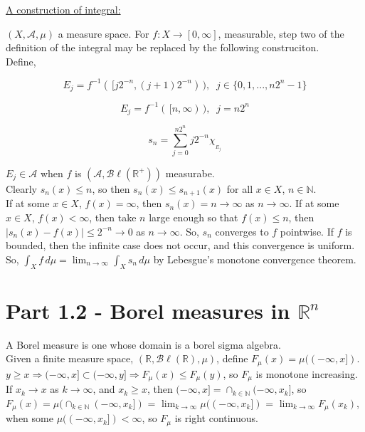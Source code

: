 \documentclass[12pt]{article}
\newcommand{\nats}[0] { \mathbb{N}}
\newcommand{\reals}[0] { \mathbb{R}}
\newcommand{\A}[0] { \mathcal{A} }
\newcommand{\Bl}[0] { \mathcal{B} \ell }
\newcommand{\rimply}[0] { \Rightarrow }
\newcommand{\rarw}[0] { \rightarrow }
\begin{document}
\begin{flushleft}
\underline{A construction of integral:}
\end{flushleft}

$(X ,\A, \mu)$ a measure space. For $f: X \rarw [0, \infty]$, measurable, step two of the definition of the integral may be replaced by the following construciton. \\

Define,

$$
E_j = f^{-1} ( \, [ j 2^{-n}, (j+1) 2^{-n} ) \, ), \; \; j \in \{ 0,1,...,n2^n-1 \}
$$

$$
E_j = f^{-1} ( \, [ n, \infty ) \, ), \; \; j = n2^n
$$

$$
s_n = \sum_{j=0}^{n2^n} j2^{-n} \chi_{_{E_j}} 
$$


$E_j \in \A$ when $f$ is $( \A, \Bl(\reals^+) )$ measurabe.  \\

Clearly $s_n(x) \le n$, so then $s_n(x) \le s_{n+1}(x)$ for all $x \in X$, $n \in \nats$.\\

If at some $x \in X$, $f(x) = \infty$, then $s_n(x) = n \rarw \infty$ as $n \rarw \infty$. If at some $x \in X$, $f(x) < \infty $, then take $n$ large enough so that $f(x) \le n$, then $|s_n(x) - f(x)| \le 2^{-n} \rarw 0$ as $n \rarw \infty$. So, $s_n$ converges to $f$ pointwise. If $f$ is bounded, then the infinite case does not occur, and this convergence is uniform. \\

So, $\int_X f \, d\mu = \lim_{n \rarw \infty} \int_X s_n \, d\mu$ by Lebesgue's monotone convergence theorem.	




\section*{Part 1.2 - Borel measures in $\reals^n$}

A Borel measure is one whose domain is a borel sigma algebra. \\

Given a finite measure space, $(\reals, \Bl(\reals), \mu )$, define $F_\mu(x) = \mu((-\infty,x])$. \\

$y \ge x \rimply (-\infty,x] \subset (-\infty,y] \rimply F_\mu(x) \le F_\mu(y)$, so $F_\mu$ is monotone increasing. \\

If $x_k \rarw x$ as $k \rarw \infty$, and $x_k \ge x$, 
then $ ( -\infty, x ] = \cap_{k \in \nats} ( -\infty, x_k ] $,
so $F_\mu(x) = \mu( \cap_{k \in \nats} ( -\infty, x_k ]  )$ = $\lim_{ k \rarw \infty } \mu( ( -\infty, x_k ] )$
= $\lim_{ k \rarw \infty } F_\mu(x_k)$, when some $\mu( ( -\infty, x_k ] ) < \infty$, so $F_\mu$ is right continuous.  
\end{document}
